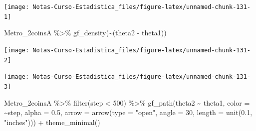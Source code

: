 \documentclass[
  12pt,
]{book}
\newenvironment{Shaded}{\begin{snugshade}}{\end{snugshade}}
\newcommand{\AttributeTok}[1]{\textcolor[rgb]{0.77,0.63,0.00}{#1}}
\newcommand{\DecValTok}[1]{\textcolor[rgb]{0.00,0.00,0.81}{#1}}
\newcommand{\FloatTok}[1]{\textcolor[rgb]{0.00,0.00,0.81}{#1}}
\newcommand{\FunctionTok}[1]{\textcolor[rgb]{0.00,0.00,0.00}{#1}}
\newcommand{\NormalTok}[1]{#1}
\newcommand{\SpecialCharTok}[1]{\textcolor[rgb]{0.00,0.00,0.00}{#1}}
\newcommand{\StringTok}[1]{\textcolor[rgb]{0.31,0.60,0.02}{#1}}
\theoremstyle{definition}
\theoremstyle{definition}
\theoremstyle{definition}
\theoremstyle{remark}
\begin{document}
\begin{center}\texttt{[image: Notas-Curso-Estadistica\_files/figure-latex/unnamed-chunk-131-1]} \end{center}

\begin{Shaded}
\begin{Highlighting}[]
\NormalTok{Metro\_2coinsA }\SpecialCharTok{\%\textgreater{}\%} \FunctionTok{gf\_density}\NormalTok{(}\SpecialCharTok{\textasciitilde{}}\NormalTok{(theta2 }\SpecialCharTok{{-}}\NormalTok{ theta1))}
\end{Highlighting}
\end{Shaded}

\begin{center}\texttt{[image: Notas-Curso-Estadistica\_files/figure-latex/unnamed-chunk-131-2]} \end{center}

\begin{Shaded}
\end{Shaded}

\begin{center}\texttt{[image: Notas-Curso-Estadistica\_files/figure-latex/unnamed-chunk-131-3]} \end{center}

\begin{Shaded}
\begin{Highlighting}[]
\NormalTok{Metro\_2coinsA }\SpecialCharTok{\%\textgreater{}\%} \FunctionTok{filter}\NormalTok{(step }\SpecialCharTok{\textless{}} \DecValTok{500}\NormalTok{) }\SpecialCharTok{\%\textgreater{}\%} \FunctionTok{gf\_path}\NormalTok{(theta2 }\SpecialCharTok{\textasciitilde{}} 
\NormalTok{    theta1, }\AttributeTok{color =} \SpecialCharTok{\textasciitilde{}}\NormalTok{step, }\AttributeTok{alpha =} \FloatTok{0.5}\NormalTok{, }\AttributeTok{arrow =} \FunctionTok{arrow}\NormalTok{(}\AttributeTok{type =} \StringTok{"open"}\NormalTok{, }
    \AttributeTok{angle =} \DecValTok{30}\NormalTok{, }\AttributeTok{length =} \FunctionTok{unit}\NormalTok{(}\FloatTok{0.1}\NormalTok{, }\StringTok{"inches"}\NormalTok{))) }\SpecialCharTok{+} \FunctionTok{theme\_minimal}\NormalTok{()}
\end{Highlighting}
\end{Shaded}
\end{document}
